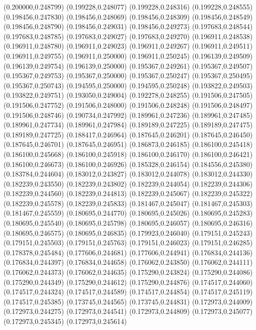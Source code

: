 (0.200000,0.248799)
(0.199228,0.248077)
(0.199228,0.248316)
(0.199228,0.248555)
(0.198456,0.247830)
(0.198456,0.248069)
(0.198456,0.248309)
(0.198456,0.248549)
(0.198456,0.248790)
(0.198456,0.249031)
(0.198456,0.249273)
(0.197683,0.248544)
(0.197683,0.248785)
(0.197683,0.249027)
(0.197683,0.249270)
(0.196911,0.248538)
(0.196911,0.248780)
(0.196911,0.249023)
(0.196911,0.249267)
(0.196911,0.249511)
(0.196911,0.249755)
(0.196911,0.250000)
(0.196911,0.250245)
(0.196139,0.249509)
(0.196139,0.249754)
(0.196139,0.250000)
(0.195367,0.249261)
(0.195367,0.249507)
(0.195367,0.249753)
(0.195367,0.250000)
(0.195367,0.250247)
(0.195367,0.250495)
(0.195367,0.250743)
(0.194595,0.250000)
(0.194595,0.250248)
(0.193822,0.249503)
(0.193822,0.249751)
(0.193050,0.249004)
(0.192278,0.248255)
(0.191506,0.247505)
(0.191506,0.247752)
(0.191506,0.248000)
(0.191506,0.248248)
(0.191506,0.248497)
(0.191506,0.248746)
(0.190734,0.247992)
(0.189961,0.247236)
(0.189961,0.247485)
(0.189961,0.247734)
(0.189961,0.247984)
(0.189189,0.247225)
(0.189189,0.247475)
(0.189189,0.247725)
(0.188417,0.246964)
(0.187645,0.246201)
(0.187645,0.246450)
(0.187645,0.246701)
(0.187645,0.246951)
(0.186873,0.246185)
(0.186100,0.245418)
(0.186100,0.245668)
(0.186100,0.245918)
(0.186100,0.246170)
(0.186100,0.246421)
(0.186100,0.246673)
(0.186100,0.246926)
(0.185328,0.246154)
(0.184556,0.245380)
(0.183784,0.244604)
(0.183012,0.243827)
(0.183012,0.244078)
(0.183012,0.244330)
(0.182239,0.243550)
(0.182239,0.243802)
(0.182239,0.244054)
(0.182239,0.244306)
(0.182239,0.244560)
(0.182239,0.244813)
(0.182239,0.245067)
(0.182239,0.245322)
(0.182239,0.245578)
(0.182239,0.245833)
(0.181467,0.245047)
(0.181467,0.245303)
(0.181467,0.245559)
(0.180695,0.244770)
(0.180695,0.245026)
(0.180695,0.245283)
(0.180695,0.245540)
(0.180695,0.245798)
(0.180695,0.246057)
(0.180695,0.246316)
(0.180695,0.246575)
(0.180695,0.246835)
(0.179923,0.246040)
(0.179151,0.245243)
(0.179151,0.245503)
(0.179151,0.245763)
(0.179151,0.246023)
(0.179151,0.246285)
(0.178378,0.245484)
(0.177606,0.244681)
(0.177606,0.244941)
(0.176834,0.244136)
(0.176834,0.244397)
(0.176834,0.244658)
(0.176062,0.243850)
(0.176062,0.244111)
(0.176062,0.244373)
(0.176062,0.244635)
(0.175290,0.243824)
(0.175290,0.244086)
(0.175290,0.244349)
(0.175290,0.244612)
(0.175290,0.244876)
(0.174517,0.244060)
(0.174517,0.244324)
(0.174517,0.244589)
(0.174517,0.244854)
(0.174517,0.245119)
(0.174517,0.245385)
(0.173745,0.244565)
(0.173745,0.244831)
(0.172973,0.244009)
(0.172973,0.244275)
(0.172973,0.244541)
(0.172973,0.244809)
(0.172973,0.245077)
(0.172973,0.245345)
(0.172973,0.245614)

